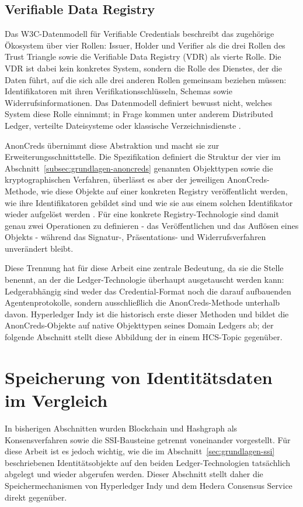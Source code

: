 \subsection{Verifiable Data Registry}
\label{subsec:grundlagen-vdr}
Das W3C-Datenmodell für Verifiable Credentials beschreibt das zugehörige Ökosystem über vier Rollen: Issuer, Holder und Verifier als die drei Rollen des Trust Triangle sowie die Verifiable Data Registry (VDR) als vierte Rolle. Die VDR ist dabei kein konkretes System, sondern die Rolle des Dienstes, der die Daten führt, auf die sich alle drei anderen Rollen gemeinsam beziehen müssen: Identifikatoren mit ihren Verifikationsschlüsseln, Schemas sowie Widerrufsinformationen. Das Datenmodell definiert bewusst nicht, welches System diese Rolle einnimmt; in Frage kommen unter anderem Distributed Ledger, verteilte Dateisysteme oder klassische Verzeichnisdienste \cite{w3cvcdm}.

AnonCreds übernimmt diese Abstraktion und macht sie zur Erweiterungsschnittstelle. Die Spezifikation definiert die Struktur der vier im Abschnitt~\ref{subsec:grundlagen-anoncreds} genannten Objekttypen sowie die kryptographischen Verfahren, überlässt es aber der jeweiligen AnonCreds-Methode, wie diese Objekte auf einer konkreten Registry veröffentlicht werden, wie ihre Identifikatoren gebildet sind und wie sie aus einem solchen Identifikator wieder aufgelöst werden \cite{anoncredsspec}. Für eine konkrete Registry-Technologie sind damit genau zwei Operationen zu definieren - das Veröffentlichen und das Auflösen eines Objekts - während das Signatur-, Präsentations- und Widerrufsverfahren unverändert bleibt.

Diese Trennung hat für diese Arbeit eine zentrale Bedeutung, da sie die Stelle benennt, an der die Ledger-Technologie überhaupt ausgetauscht werden kann: Ledgerabhängig sind weder das Credential-Format noch die darauf aufbauenden Agentenprotokolle, sondern ausschließlich die AnonCreds-Methode unterhalb davon. Hyperledger Indy ist die historisch erste dieser Methoden und bildet die AnonCreds-Objekte auf native Objekttypen seines Domain Ledgers ab; der folgende Abschnitt stellt diese Abbildung der in einem HCS-Topic gegenüber.


\section{Speicherung von Identitätsdaten im Vergleich}
\label{sec:grundlagen-speichermodelle}

In bisherigen Abschnitten wurden Blockchain und Hashgraph als Konsensverfahren sowie die SSI-Bausteine getrennt voneinander vorgestellt. Für diese Arbeit ist es jedoch wichtig, wie die im Abschnitt~\ref{sec:grundlagen-ssi} beschriebenen Identitätsobjekte auf den beiden Ledger-Technologien tatsächlich abgelegt und wieder abgerufen werden. Dieser Abschnitt stellt daher die Speichermechanismen von Hyperledger Indy und dem Hedera Consensus Service direkt gegenüber.

